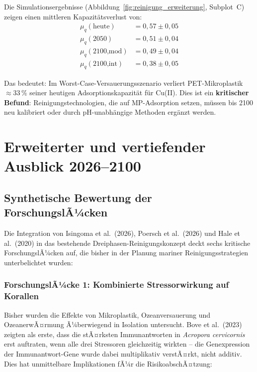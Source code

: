 ﻿\documentclass[12pt,a4paper]{article}
\theoremstyle{definition}
\theoremstyle{remark}
\newcommand{\MP}{Mikroplastik}
\begin{document}
Die Simulationsergebnisse (Abbildung~\ref{fig:reinigung_erweiterung}, Subplot~C)
zeigen einen mittleren Kapazit\"atsverlust von:
\begin{align}
  \mu_q(\text{heute}) &= 0{,}57 \pm 0{,}05 \\
  \mu_q(2050)          &= 0{,}51 \pm 0{,}04 \\
  \mu_q(2100\text{,mod}) &= 0{,}49 \pm 0{,}04 \\
  \mu_q(2100\text{,int}) &= 0{,}38 \pm 0{,}05
\end{align}

Das bedeutet: Im Worst-Case-Versauerungsszenario verliert PET-Mikroplastik
$\approx 33\,\%$ seiner heutigen Adsorptionskapazit\"at f\"ur Cu(II).
Dies ist ein \textbf{kritischer Befund}: Reinigungstechnologien, die auf
MP-Adsorption setzen, m\"ussen bis 2100 neu kalibriert oder durch pH-unabh\"angige
Methoden erg\"anzt werden.

\section{Erweiterter und vertiefender Ausblick 2026--2100}
\label{sec:ausblick_erweitert}

\subsection{Synthetische Bewertung der ForschungslÃ¼cken}
\label{subsec:forschungsluecken}

Die Integration von Isingoma et al.\ (2026), Poersch et al.\ (2026)
und Hale et al.\ (2020) in das bestehende Dreiphasen-Reinigungskonzept
deckt sechs kritische ForschungslÃ¼cken auf, die bisher in der Planung
mariner Reinigungsstrategien unterbelichtet wurden:

\subsubsection{ForschungslÃ¼cke 1: Kombinierte Stressorwirkung auf Korallen}

Bisher wurden die Effekte von \MP{}, Ozeanversauerung und OzeanerwÃ¤rmung
Ã¼berwiegend in Isolation untersucht. Bove et al.\ (2023) zeigten als erste,
dass die stÃ¤rksten Immunantworten in \textit{Acropora cervicornis} erst
auftraten, wenn alle drei Stressoren gleichzeitig wirkten -- die
Genexpression der Immunantwort-Gene wurde dabei multiplikativ verstÃ¤rkt,
nicht additiv. Dies hat unmittelbare Implikationen fÃ¼r die RisikoabschÃ¤tzung:
\end{document}
